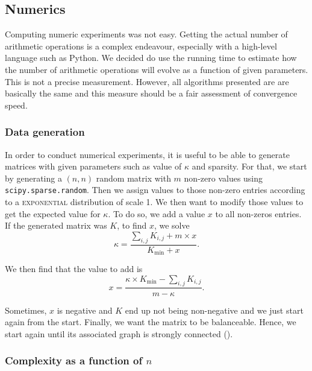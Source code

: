 \subsection{Numerics}

Computing numeric experiments was not easy. Getting the actual number of arithmetic operations is a complex endeavour, especially with a high-level language such as Python. We decided do use the running time to estimate how the number of arithmetic operations will evolve as a function of given parameters. This is not a precise measurement. However, all algorithms presented are are basically the same and this measure should be a fair assessment of convergence speed. 


\subsubsection{Data generation}\label{data_genaration}

In order to conduct numerical experiments, it is useful to be able to generate matrices with given parameters such as value of \(\kappa\) and sparsity. For that, we start by generating a \((n,n)\) random matrix with \(m\) non-zero values using \texttt{scipy.sparse.random}. Then we assign values to those non-zero entries according to a \textsc{exponential} distribution of scale 1. We then want to modify those values to get the expected value for \(\kappa\). To do so, we add a value \(x\) to all non-zeros entries. If the generated matrix was \(K\), to find \(x\), we solve 
\[
    \kappa = \dfrac{\sum_{i,j} K_{i,j} + m \times x}{K_{\text{min}} + x}.
\]        

We then find that the value to add is 
\[
    x = \dfrac{\kappa \times K_\text{min} - \sum_{i,j}K_{i,j}}{m - \kappa}.   
\]

Sometimes, \(x\) is negative and \(K\) end up not being non-negative and we just start again from the start. Finally, we want the matrix to be balanceable. Hence, we start again until its associated graph is strongly connected (). 

\subsubsection{Complexity as a function of \(n\)}

